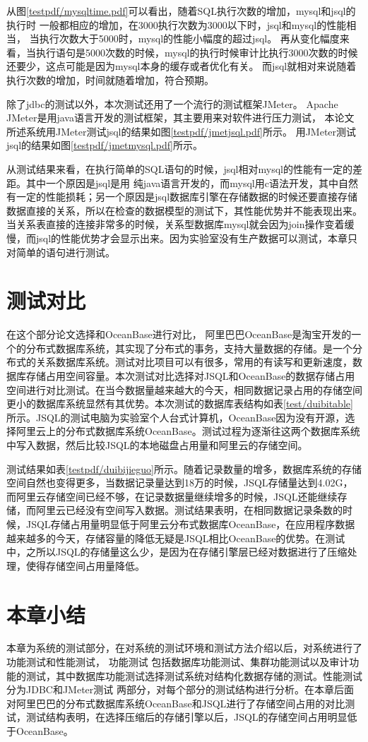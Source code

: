 

从图\ref{testpdf/mysqltime.pdf}可以看出，随着SQL执行次数的增加，mysql和jsql的执行时
一般都相应的增加，在3000执行次数为3000以下时，jsql和mysql的性能相当，
当执行次数大于5000时，mysql的性能小幅度的超过jsql。
再从变化幅度来看，当执行语句是5000次数的时候，mysql的执行时候审计比执行3000次数的时候
还要少，这点可能是因为mysql本身的缓存或者优化有关。
而jsql就相对来说随着执行次数的增加，时间就随着增加，符合预期。

除了jdbc的测试以外，本次测试还用了一个流行的测试框架JMeter。
Apache JMeter是用java语言开发的测试框架，其主要用来对软件进行压力测试，
   本论文所述系统用JMeter测试jsql的结果如图\ref{testpdf/jmetjsql.pdf}所示。
    用JMeter测试jsql的结果如图\ref{testpdf/jmetmysql.pdf}所示。
   
   从测试结果来看，在执行简单的SQL语句的时候，jsql相对mysql的性能有一定的差距。其中一个原因是jsql是用
   纯java语言开发的，而mysql用c语法开发，其中自然有一定的性能损耗；另一个原因是jsql数据库引擎在存储数据的时候还要直接存储数据直接的关系，所以在检查的数据模型的测试下，其性能优势并不能表现出来。当关系表直接的连接非常多的时候，关系型数据库mysql就会因为join操作变着缓慢，而jsql的性能优势才会显示出来。因为实验室没有生产数据可以测试，本章只对简单的语句进行测试。
\section{测试对比}
在这个部分论文选择和OceanBase进行对比，
阿里巴巴OceanBase是淘宝开发的一个的分布式数据库系统，其实现了分布式的事务，支持大量数据的存储。是一个分布式的关系数据库系统。测试对比项目可以有很多，常用的有读写和更新速度，数据库存储占用空间容量。本次测试对比选择对JSQL和OceanBase的数据存储占用空间进行对比测试。在当今数据量越来越大的今天，相同数据记录占用的存储空间更小的数据库系统显然有其优势。本次测试的数据库表结构如表\ref{test/duibitable}所示。JSQL的测试电脑为实验室个人台式计算机，OceanBase因为没有开源，选择阿里云上的分布式数据库系统OceanBase。测试过程为逐渐往这两个数据库系统中写入数据，然后比较JSQL的本地磁盘占用量和阿里云的存储空间。

测试结果如表\ref{testpdf/duibijieguo}所示。随着记录数量的增多，数据库系统的存储空间自然也变得更多，当数据记录量达到18万的时候，JSQL存储量达到4.02G，而阿里云存储空间已经不够，在记录数据量继续增多的时候，JSQL还能继续存储，而阿里云已经没有空间写入数据。测试结果表明，在相同数据记录条数的时候，JSQL存储占用量明显低于阿里云分布式数据库OceanBase，在应用程序数据越来越多的今天，存储容量的降低无疑是JSQL相比OceanBase的优势。在测试中，之所以JSQL的存储量这么少，是因为在存储引擎层已经对数据进行了压缩处理，使得存储空间占用量降低。
\section{本章小结}
本章为系统的测试部分，在对系统的测试环境和测试方法介绍以后，对系统进行了功能测试和性能测试，
功能测试
包括数据库功能测试、集群功能测试以及审计功能的测试，其中数据库功能测试选择测试系统对结构化数据存储的测试。性能测试分为JDBC和JMeter测试
两部分，对每个部分的测试结构进行分析。在本章后面对阿里巴巴的分布式数据库系统OceanBase和JSQL进行了存储空间占用的对比测试，测试结构表明，在选择压缩后的存储引擎以后，JSQL的存储空间占用明显低于OceanBase。